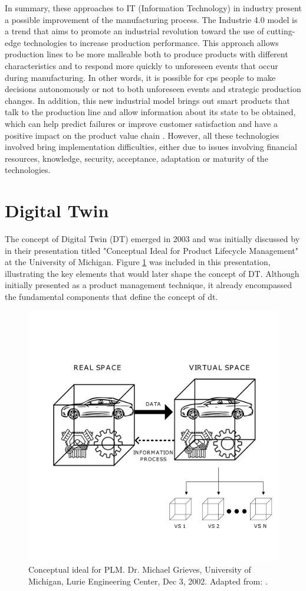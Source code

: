 In summary, these approaches to IT (Information Technology) in industry present a possible improvement of the manufacturing process. The Industrie 4.0 model is a trend that aims to promote an industrial revolution toward the use of cutting-edge technologies to increase production performance. This approach allows production lines to be more malleable both to produce products with different characteristics and to respond more quickly to unforeseen events that occur during manufacturing. In other words, it is possible for \acrshort{cps} people to make decisions autonomously or not to both unforeseen events and strategic production changes. In addition, this new industrial model brings out smart products that talk to the production line and allow information about its state to be obtained, which can help predict failures or improve customer satisfaction and have a positive impact on the product value chain \cite{economies6030046}.  However, all these technologies involved bring implementation difficulties, either due to issues involving financial resources, knowledge, security, acceptance, adaptation or maturity of the technologies.  



\section{Digital Twin}
\label{sec:digitalTwin}

The concept of Digital Twin (DT) emerged in 2003 \cite{Mihai2022, Barricelli2019} and was initially discussed by \cite{Grieves2017} in their presentation titled "Conceptual Ideal for Product Lifecycle Management" at the University of Michigan. Figure \ref{fig:digitalTwin} was included in this presentation, illustrating the key elements that would later shape the concept of DT. Although initially presented as a product management technique, it already encompassed the fundamental components that define the concept of \acrlong{dt}.

\begin{figure}[ht!]
    \centering
    \includegraphics[width=0.65\linewidth]{images/Related/CAR.pdf}
    \caption{Conceptual ideal for PLM. Dr. Michael Grieves, University of Michigan, Lurie Engineering Center, Dec 3, 2002. Adapted from: \cite{Grieves2017}.}

    \label{fig:digitalTwin}
\end{figure}

